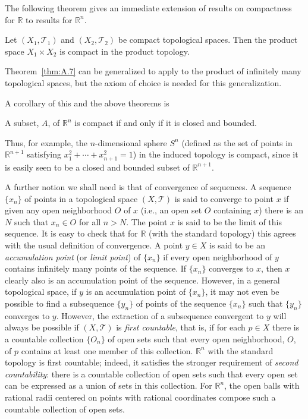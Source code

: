 The following theorem gives an immediate extension of results on compactness for
\(\mathbb R\) to results for \(\mathbb R^n\).

\begin{theorem}\label{thm:A.7}
Let \((X_1,\mathcal T_1)\) and \((X_2,\mathcal T_2)\) be compact topological spaces.
Then the product space \(X_1\times X_2\) is compact in the product topology.
\end{theorem}

Theorem~\ref{thm:A.7} can be generalized to apply to the product of infinitely many
topological spaces, but the axiom of choice is needed for this generalization.

A corollary of this and the above theorems is

\begin{theorem}\label{thm:A.8}
A subset, \(A\), of \(\mathbb R^n\) is compact if and only if it is closed and bounded.
\end{theorem}

Thus, for example, the \(n\)-dimensional sphere \(S^n\) (defined as the set of points
in \(\mathbb R^{n+1}\) satisfying \(x_1^2+\cdots+x_{n+1}^2=1\)) in the induced
topology is compact, since it is easily seen to be a closed and bounded subset of
\(\mathbb R^{n+1}\).

A further notion we shall need is that of convergence of sequences. A sequence
\(\{x_n\}\) of points in a topological space \((X,\mathcal T)\) is said to converge to
point \(x\) if given any open neighborhood \(O\) of \(x\) (i.e., an open set \(O\)
containing \(x\)) there is an \(N\) such that \(x_n\in O\) for all \(n>N\). The point
\(x\) is said to be the limit of this sequence. It is easy to check that for
\(\mathbb R\) (with the standard topology) this agrees with the usual definition of
convergence. A point \(y\in X\) is said to be an \emph{accumulation point} (or
\emph{limit point}) of \(\{x_n\}\) if every open neighborhood of \(y\) contains
infinitely many points of the sequence. If \(\{x_n\}\) converges to \(x\), then \(x\)
clearly also is an accumulation point of the sequence. However, in a general
topological space, if \(y\) is an accumulation point of \(\{x_n\}\), it may not even
be possible to find a subsequence \(\{y_n\}\) of points of the sequence \(\{x_n\}\)
such that \(\{y_n\}\) converges to \(y\). However, the extraction of a subsequence
convergent to \(y\) will always be possible if \((X,\mathcal T)\) is \emph{first
countable}, that is, if for each \(p\in X\) there is a countable collection
\(\{O_n\}\) of open sets such that every open neighborhood, \(O\), of \(p\) contains
at least one member of this collection. \(\mathbb R^n\) with the standard topology is
first countable; indeed, it satisfies the stronger requirement of \emph{second
countability}: there is a countable collection of open sets such that every open set
can be expressed as a union of sets in this collection. For \(\mathbb R^n\), the open
balls with rational radii centered on points with rational coordinates compose such a
countable collection of open sets.

